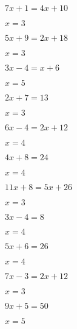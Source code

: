\documentclass{ximera}
\begin{document}
\begin{exercise}
\begin{xmmulticols}
  \begin{question} \( 7x + 1  =  4x + 10    \) \begin{uitkomst} \( x  = 3  \) \end{uitkomst} \end{question}
  \begin{question} \( 5x + 9  =  2x + 18    \) \begin{uitkomst} \( x  = 3  \) \end{uitkomst} \end{question}
  \begin{question} \( 3x - 4  =  x + 6      \) \begin{uitkomst} \( x  = 5  \) \end{uitkomst} \end{question}
  \begin{question} \( 2x + 7  =  13         \) \begin{uitkomst} \( x  = 3  \) \end{uitkomst} \end{question}
  \begin{question} \( 6x - 4  =  2x + 12    \) \begin{uitkomst} \( x  = 4  \) \end{uitkomst} \end{question}
  \begin{question} \( 4x + 8  =  24         \) \begin{uitkomst} \( x  = 4  \) \end{uitkomst} \end{question}
  \begin{question} \( 11x + 8 =  5x + 26    \) \begin{uitkomst} \( x  = 3  \) \end{uitkomst} \end{question}
  \begin{question} \( 3x - 4  =  8          \) \begin{uitkomst} \( x  = 4  \) \end{uitkomst} \end{question}
  \begin{question} \( 5x + 6  =  26         \) \begin{uitkomst} \( x  = 4  \) \end{uitkomst} \end{question}
  \begin{question} \( 7x - 3  =  2x + 12    \) \begin{uitkomst} \( x  = 3  \) \end{uitkomst} \end{question}
  \begin{question} \( 9x + 5  =  50         \) \begin{uitkomst} \( x  = 5  \) \end{uitkomst} \end{question}
  
\end{xmmulticols}
\end{exercise}
\end{document}
